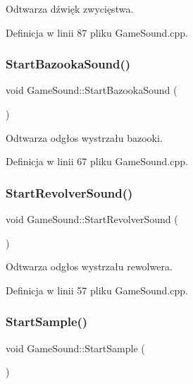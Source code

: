 Odtwarza dźwięk zwycięstwa. 



Definicja w linii 87 pliku Game\+Sound.\+cpp.

\mbox{\label{class_game_sound_ab3bc96f5be15c7a9be79a035ec16638c}} 
\subsubsection{\texorpdfstring{Start\+Bazooka\+Sound()}{StartBazookaSound()}}
{\footnotesize\ttfamily void Game\+Sound\+::\+Start\+Bazooka\+Sound (\begin{DoxyParamCaption}{ }\end{DoxyParamCaption})}



Odtwarza odgłos wystrzału bazooki. 



Definicja w linii 67 pliku Game\+Sound.\+cpp.

\mbox{\label{class_game_sound_a909e0c0bc44437ea2853e734ab548e5a}} 
\subsubsection{\texorpdfstring{Start\+Revolver\+Sound()}{StartRevolverSound()}}
{\footnotesize\ttfamily void Game\+Sound\+::\+Start\+Revolver\+Sound (\begin{DoxyParamCaption}{ }\end{DoxyParamCaption})}



Odtwarza odgłos wystrzału rewolwera. 



Definicja w linii 57 pliku Game\+Sound.\+cpp.

\mbox{\label{class_game_sound_a30db244babc1e4aa518bd56500cea028}} 
\subsubsection{\texorpdfstring{Start\+Sample()}{StartSample()}}
{\footnotesize\ttfamily void Game\+Sound\+::\+Start\+Sample (\begin{DoxyParamCaption}{ }\end{DoxyParamCaption})}



